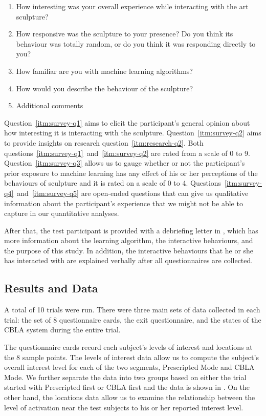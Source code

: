 \begin{enumerate}
	\item How interesting was your overall experience while interacting with the art 
	sculpture? \label{itm:survey-q1}
	\item How responsive was the sculpture to your presence?  Do you think its behaviour was totally random, or do you think it was responding directly to you? \label{itm:survey-q2}
	\item How familiar are you with machine learning algorithms? \label{itm:survey-q3}
	\item How would you describe the behaviour of the sculpture? \label{itm:survey-q4}
	\item Additional comments \label{itm:survey-q5}
\end{enumerate}

Question~\ref{itm:survey-q1} aims to elicit the participant's general opinion about how interesting it is interacting with the sculpture. Question~\ref{itm:survey-q2} aims to provide insights on research question~\ref{itm:research-q2}. Both questions~\ref{itm:survey-q1}~and~\ref{itm:survey-q2} are rated from a scale of 0 to 9. Question~\ref{itm:survey-q3} allows us to gauge whether or not the participant's prior exposure to machine learning has any effect of his or her perceptions of the behaviours of sculpture and it is rated on a scale of 0 to 4. Questions~\ref{itm:survey-q4}~and~\ref{itm:survey-q5} are open-ended questions that can give us qualitative information about the participant's experience that we might not be able to capture in our quantitative analyses. 


After that, the test participant is provided with a debriefing letter in , which has more information about the learning algorithm, the interactive behaviours, and the purpose of this study. In addition, the interactive behaviours that he or she has interacted with are explained verbally after all questionnaires are collected.

\subsection{Results and Data}

A total of 10 trials were run. There were three main sets of data collected in each trial: the set of 8 questionnaire cards, the exit questionnaire, and the states of the CBLA system during the entire trial.

The questionnaire cards record each subject's levels of interest and locations at the 8 sample points. The levels of interest data allow us to compute the subject's overall interest level for each of the two segments, Prescripted Mode and CBLA Mode. We further separate the data into two groups based on either the trial started with Prescripted first or CBLA first and the data is shown in . On the other hand, the locations data allow us to examine the relationship between the level of activation near the test subjects to his or her reported interest level.

